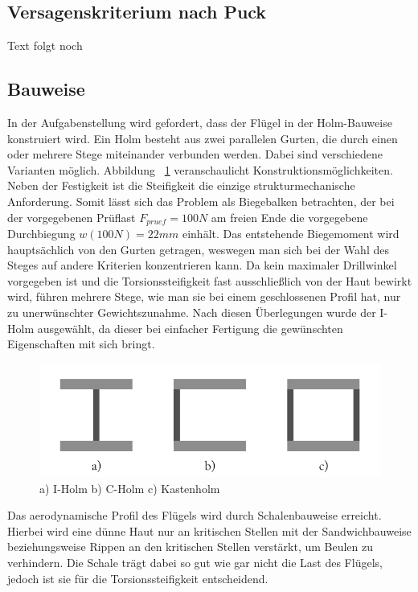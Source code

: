 \subsection{Versagenskriterium nach Puck}
Text folgt noch
\subsection{Bauweise}
In der Aufgabenstellung wird gefordert, dass der Flügel in der Holm-Bauweise konstruiert wird. Ein Holm besteht aus zwei parallelen Gurten, die durch einen oder mehrere Stege miteinander verbunden werden. Dabei sind verschiedene Varianten möglich. Abbildung ~\ref{fig: Holmarten} veranschaulicht Konstruktionsmöglichkeiten. Neben der Festigkeit ist die Steifigkeit die einzige strukturmechanische Anforderung. Somit lässt sich das Problem als Biegebalken betrachten, der bei der vorgegebenen Prüflast $ F_{pruef}=100N $ am freien Ende die vorgegebene Durchbiegung $ w(100N)=22mm $ einhält. Das entstehende Biegemoment wird hauptsächlich von den Gurten getragen, weswegen man sich bei der Wahl des Steges auf andere Kriterien konzentrieren kann. Da kein maximaler Drillwinkel vorgegeben ist und die Torsionssteifigkeit fast ausschließlich von der Haut bewirkt wird, führen mehrere Stege, wie man sie bei einem geschlossenen Profil hat, nur zu unerwünschter Gewichtszunahme. Nach diesen Überlegungen wurde der I-Holm ausgewählt, da dieser bei einfacher Fertigung die gewünschten Eigenschaften mit sich bringt.
\begin{figure}
	\includegraphics[width=1.0\textwidth]{Bilder/Holmarten.png}
	\caption{a) I-Holm   b) C-Holm    c) Kastenholm}
	\label{fig: Holmarten}
\end{figure} 
Das aerodynamische Profil des Flügels wird durch Schalenbauweise erreicht. Hierbei wird eine dünne Haut nur an kritischen Stellen mit der Sandwichbauweise beziehungsweise Rippen an den kritischen Stellen verstärkt, um Beulen zu verhindern. Die Schale trägt dabei so gut wie gar nicht die Last des Flügels, jedoch ist sie für die Torsionssteifigkeit entscheidend.
